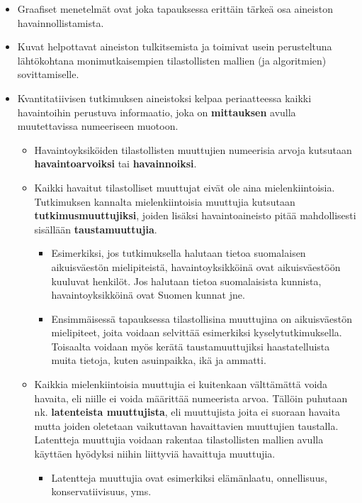 \documentclass[
]{book}
\providecommand{\tightlist}{%
  \setlength{\itemsep}{0pt}\setlength{\parskip}{0pt}}
\begin{document}
\begin{itemize}
\begin{itemize}
    \begin{itemize}
    \tightlist
    \item
      Graafiset menetelmät ovat joka tapauksessa erittäin tärkeä osa aineiston havainnollistamista.
    \item
      Kuvat helpottavat aineiston tulkitsemista ja toimivat usein perusteltuna lähtökohtana monimutkaisempien tilastollisten mallien (ja algoritmien) sovittamiselle.
    \end{itemize}
  \end{itemize}
\end{itemize}

\hfill\break

\begin{itemize}
\tightlist
\item
  Kvantitatiivisen tutkimuksen aineistoksi kelpaa periaatteessa kaikki havaintoihin perustuva informaatio, joka on \textbf{mittauksen} avulla muutettavissa numeeriseen muotoon.

  \begin{itemize}
  \tightlist
  \item
    Havaintoyksiköiden tilastollisten muuttujien numeerisia arvoja kutsutaan \textbf{havaintoarvoiksi} tai \textbf{havainnoiksi}.
  \item
    Kaikki havaitut tilastolliset muuttujat eivät ole aina mielenkiintoisia. Tutkimuksen kannalta mielenkiintoisia muuttujia kutsutaan \textbf{tutkimusmuuttujiksi}, joiden lisäksi havaintoaineisto pitää mahdollisesti sisällään \textbf{taustamuuttujia}.

    \begin{itemize}
    \tightlist
    \item
      Esimerkiksi, jos tutkimuksella halutaan tietoa suomalaisen aikuisväestön mielipiteistä, havaintoyksikköinä ovat aikuisväestöön kuuluvat henkilöt. Jos halutaan tietoa suomalaisista kunnista, havaintoyksikköinä ovat Suomen kunnat jne.
    \item
      Ensimmäisessä tapauksessa tilastollisina muuttujina on aikuisväestön mielipiteet, joita voidaan selvittää esimerkiksi kyselytutkimuksella. Toisaalta voidaan myös kerätä taustamuuttujiksi haastatelluista muita tietoja, kuten asuinpaikka, ikä ja ammatti.
    \end{itemize}
  \item
    Kaikkia mielenkiintoisia muuttujia ei kuitenkaan välttämättä voida havaita, eli niille ei voida määrittää numeerista arvoa. Tällöin puhutaan nk. \textbf{latenteista muuttujista}, eli muuttujista joita ei suoraan havaita mutta joiden oletetaan vaikuttavan havaittavien muuttujien taustalla. Latentteja muuttujia voidaan rakentaa tilastollisten mallien avulla käyttäen hyödyksi niihin liittyviä havaittuja muuttujia.

    \begin{itemize}
    \tightlist
    \item
      Latentteja muuttujia ovat esimerkiksi elämänlaatu, onnellisuus, konservatiivisuus, yms.
    \end{itemize}
  \end{itemize}
\end{itemize}
\end{document}
